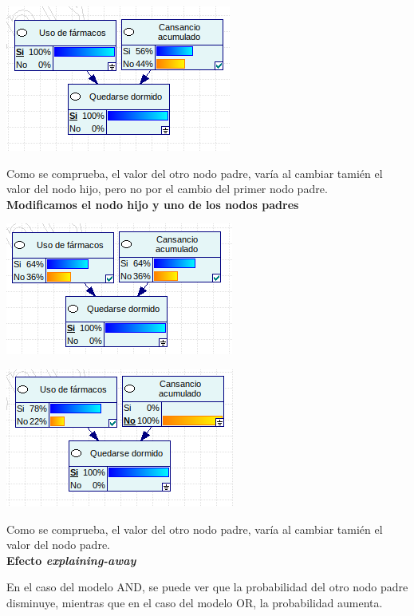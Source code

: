 \documentclass{article}
\begin{document}
\begin{center}
\includegraphics[scale=0.5]{OR3.png}
\end{center}

Como se comprueba, el valor del otro nodo padre, varía al cambiar tamién el valor del nodo hijo, pero no por el cambio del primer nodo padre.\\

\textbf{Modificamos el nodo hijo y uno de los nodos padres}

\begin{center}
\includegraphics[scale=0.5]{OR4.png}
\end{center}

\begin{center}
\includegraphics[scale=0.5]{OR5.png}
\end{center}

Como se comprueba, el valor del otro nodo padre, varía al cambiar tamién el valor del nodo padre.\\

\textbf{Efecto \textit{explaining-away}}

En el caso del modelo AND, se puede ver que la probabilidad del otro nodo padre disminuye, mientras que en el caso del modelo OR, la probabilidad aumenta.
\end{document}
